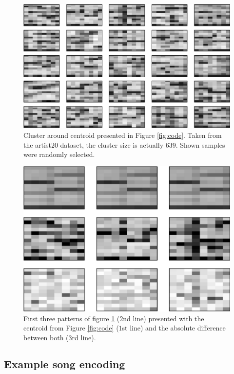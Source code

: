 \documentclass{article}
\begin{document}
\begin{figure}[t]
\begin{center}
\includegraphics[width=.9\columnwidth]{close_patterns1}
\end{center}
\caption{\small{Cluster around centroid presented in
Figure \ref{fig:code}. Taken from the artist20 dataset, the cluster
size is actually $639$. Shown samples were randomly selected.
}}
\label{fig:cluster}
\end{figure}

\begin{figure}[t]
\begin{center}
\includegraphics[width=.8\columnwidth]{close_patterns_diff}
\end{center}
\caption{\small{First three patterns of figure \ref{fig:cluster}
($2$nd line) presented with the centroid from Figure \ref{fig:code}
($1$st line) and the absolute difference between both ($3$rd line).
}}
\label{fig:cluster_diff}
\end{figure}


\subsection{Example song encoding}
\end{document}
